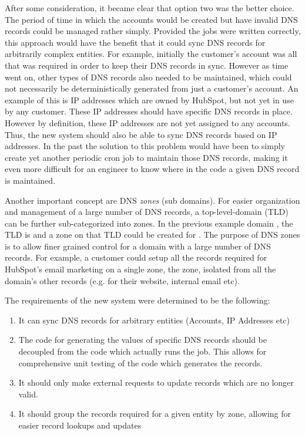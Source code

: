 After some consideration, it became clear that option two was the better choice. The period of time in which the accounts would be created but have invalid DNS records could be managed rather simply. Provided the jobs were written correctly, this approach would have the benefit that it could sync DNS records for arbitrarily complex entities. For example, initially the customer's account was all that was required in order to keep their DNS records in sync. However as time went on, other types of DNS records also needed to be maintained, which could not necessarily be deterministically generated from just a customer's account. An example of this is IP addresses which are owned by HubSpot, but not yet in use by any customer. These IP addresses should have specific DNS records in place. However by definition, these IP addresses are not yet assigned to any accounts. Thus, the new system should also be able to sync DNS records based on IP addresses. In the past the solution to this problem would have been to simply create yet another periodic cron job to maintain those DNS records, making it even more difficult for an engineer to know where in the code a given DNS record is maintained.

Another important concept are DNS \textit{zones} (sub domains). For easier organization and management of a large number of DNS records, a top-level-domain (TLD) can be further sub-categorized into zones. In the previous example domain , the TLD is  and a zone on that TLD could be created for . The purpose of DNS zones is to allow finer grained control for a domain with a large number of DNS records. For example, a customer could setup all the records required for HubSpot's email marketing on a single zone, the  zone, isolated from all the domain's other records (e.g. for their website, internal email etc). 

The requirements of the new system were determined to be the following:
\begin{enumerate}
      \item{It can sync DNS records for arbitrary entities (Accounts, IP Addresses etc)}
      \item{The code for generating the values of specific DNS records should be decoupled from the code which actually runs the job. This allows for comprehensive unit testing of the code which generates the records.}
      \item{It should only make external requests to update records which are no longer valid.}
      \item{It should group the records required for a given entity by zone, allowing for easier record lookups and updates}
\end{enumerate}

